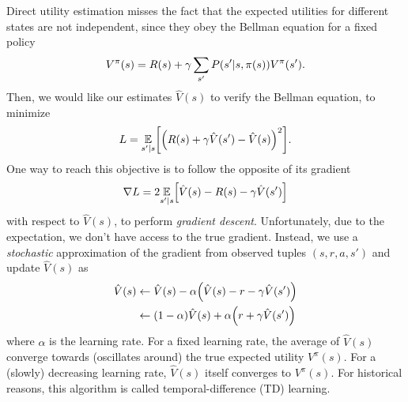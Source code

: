 \documentclass[11pt, a4paper]{article}
\begin{document}
\begin{enumerate}
    \begin{solution}
        Direct utility estimation misses the fact that the expected utilities for different states are not independent, since they obey the Bellman equation for a fixed policy
        \begin{equation*}
            V^\pi(s) = R(s) + \gamma \sum_{s'} P(s' \vert s, \pi(s)) V^\pi(s').
        \end{equation*}
        Then, we would like our estimates $\hat{V}(s)$ to verify the Bellman equation, \ie{} to minimize
        \begin{equation*}
            L = \underset{s' \knowing s}{\E} \sbk*{\rbk*{R(s) + \gamma \hat{V}(s') - \hat{V}(s)}^2} .
        \end{equation*}
        One way to reach this objective is to follow the opposite of its gradient
        \begin{equation*}
            \nabla L = 2 \underset{s' \knowing s}{\E} \sbk*{\hat{V}(s) - R(s) - \gamma \hat{V}(s')}
        \end{equation*}
        with respect to $\hat{V}(s)$, \ie{} to perform \emph{gradient descent}. Unfortunately, due to the expectation, we don't have access to the true gradient. Instead, we use a \emph{stochastic} approximation of the gradient from observed\footnotemark{} tuples $(s, r, a, s')$ and update $\hat{V}(s)$ as
        \begin{align*}
            \hat{V}(s) & \gets \hat{V}(s) - \alpha \rbk*{\hat{V}(s) - r - \gamma \hat{V}(s')} \\
            & \gets (1 - \alpha) \hat{V}(s) + \alpha \rbk*{r + \gamma \hat{V}(s')}
        \end{align*}
        where $\alpha$ is the learning rate. For a fixed learning rate, the average of $\hat{V}(s)$ converge towards (oscillates around) the true expected utility $V^\pi(s)$. For a (slowly) decreasing learning rate, $\hat{V}(s)$ itself converges to $V^\pi(s)$. For historical reasons, this algorithm is called temporal-difference (TD) learning.



\end{solution}
\end{enumerate}
\end{document}

